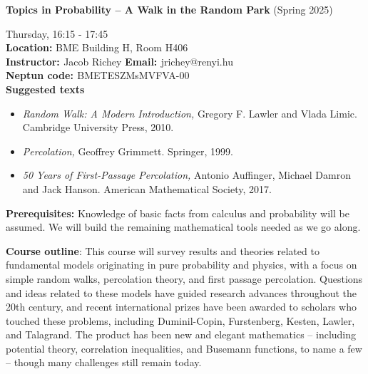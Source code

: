 \documentclass[12pt]{article}
\begin{document}
\begin{center} {\bf{ Topics in Probability -- A Walk in the Random Park}} \hfill (Spring 2025)\\
\end{center}

 Thursday, 16:15 - 17:45 \\
{\bf{Location:}} BME Building H, Room H406 \\
{\bf{Instructor: }} Jacob Richey \hfill {\bf{Email: }} jrichey@renyi.hu \\
{\bf{Neptun code: }} BMETESZMsMVFVA-00 \\



\noindent \textbf{Suggested texts}
\begin{itemize} \item {\em{Random Walk: A Modern Introduction,}} Gregory F. Lawler and Vlada Limic. Cambridge University Press, 2010. 
\item {\em{Percolation,}} Geoffrey Grimmett. Springer, 1999.
\item {\em{50 Years of First-Passage Percolation,}} Antonio Auffinger, Michael Damron and Jack Hanson. American Mathematical Society, 2017. 
\end{itemize}


\noindent \textbf{Prerequisites:} Knowledge of basic facts from calculus and probability will be assumed. We will build the remaining mathematical tools needed as we go along. 

\vspace{10pt}

\noindent \textbf{Course outline}: This course will survey results and theories related to fundamental models originating in pure probability and physics, with a focus on simple random walks, percolation theory, and first passage percolation. Questions and ideas related to these models have guided research advances throughout the 20th century, and recent international prizes have been awarded to scholars who touched these problems, including Duminil-Copin, Furstenberg, Kesten, Lawler, and Talagrand. The product has been new and elegant mathematics -- including potential theory, correlation inequalities, and Busemann functions, to name a few -- though many challenges still remain today. 

\vspace{10pt}
\end{document}
